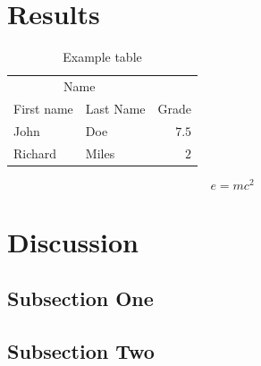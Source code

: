 \documentclass[twoside]{article}
\begin{document}

\section{Results}

\begin{table}[H]
\caption{Example table}
\centering
\begin{tabular}{llr}
\toprule
\multicolumn{2}{c}{Name} \\
\cmidrule(r){1-2}
First name & Last Name & Grade \\
\midrule
John & Doe & $7.5$ \\
Richard & Miles & $2$ \\
\bottomrule
\end{tabular}
\end{table}

\lipsum[5] %

\begin{equation}
\label{eq:emc}
e = mc^2
\end{equation}

\lipsum[6] %


\section{Discussion}

\subsection{Subsection One}

\lipsum[7] %

\subsection{Subsection Two}

\lipsum[8] %


%
% 



%





%
\end{document}
